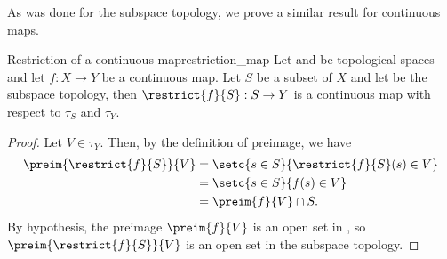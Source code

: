 As was done for the subspace topology, we prove a similar result for continuous maps.
\begin{proposition}{Restriction of a continuous map}{restriction_map}
    Let  and  be topological spaces and let \(f : X \to Y\) be a continuous map. Let \(S\) be a subset of \(X\) and let  be the subspace topology, then \(\restrict{f}{S} : S \to Y\) is a continuous map with respect to \(\tau_S\) and \(\tau_Y\).
\end{proposition}
\begin{proof}
    Let \(V \in \tau_Y\). Then, by the definition of preimage, we have
    \begin{align*}
        \preim{\restrict{f}{S}}{V} &= \setc{s \in S}{\restrict{f}{S}(s) \in V}\\
                                &= \setc{s \in S}{f(s) \in V}\\
                                &= \preim{f}{V} \cap S.
    \end{align*}
    By hypothesis, the preimage \(\preim{f}{V}\) is an open set in , so \(\preim{\restrict{f}{S}}{V}\) is an open set in the subspace topology.
\end{proof}

